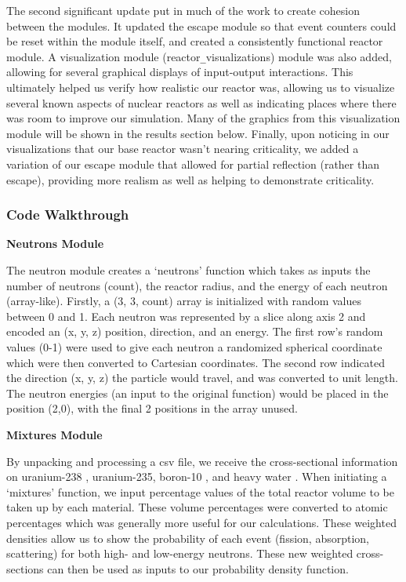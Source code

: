 \documentclass{notes}
\begin{document}
The second significant update put in much of the work to create cohesion between the modules. It updated the escape module so that event counters could be reset within the module itself, and created a consistently functional reactor module. A visualization module (reactor\verb|_|visualizations) module was also added, allowing for several graphical displays of input-output interactions. This ultimately helped us verify how realistic our reactor was, allowing us to visualize several known aspects of nuclear reactors as well as indicating places where there was room to improve our simulation. Many of the graphics from this visualization module will be shown in the results section below. Finally, upon noticing in our visualizations that our base reactor wasn't nearing criticality, we added a variation of our escape module that allowed for partial reflection (rather than escape), providing more realism as well as helping to demonstrate criticality.

\subsubsection*{Code Walkthrough}

\textbf{Neutrons Module}

The neutron module creates a `neutrons' function which takes as inputs the number of neutrons (count), the reactor radius, and the energy of each neutron (array-like). Firstly, a (3, 3, count) array is initialized with random values between 0 and 1. Each neutron was represented by a slice along axis 2 and encoded an (x, y, z) position, direction, and an energy. The first row's random values (0-1) were used to give each neutron a randomized spherical coordinate which were then converted to Cartesian coordinates. The second row indicated the direction (x, y, z) the particle would travel, and was converted to unit length. The neutron energies (an input to the original function) would be placed in the position (2,0), with the final 2 positions in the array unused.

\textbf{Mixtures Module}

By unpacking and processing a csv file, we receive the cross-sectional information on uranium-238 \cite{Kim, Andersen}, uranium-235, boron-10 \cite{Bogart}, and heavy water \cite{CrossSections}. When initiating a `mixtures' function, we input percentage values of the total reactor volume to be taken up by each material. These volume percentages were converted to atomic percentages which was generally more useful for our calculations. These weighted densities allow us to show the probability of each event (fission, absorption, scattering) for both high- and low-energy neutrons. These new weighted cross-sections can then be used as inputs to our probability density function.
\end{document}
